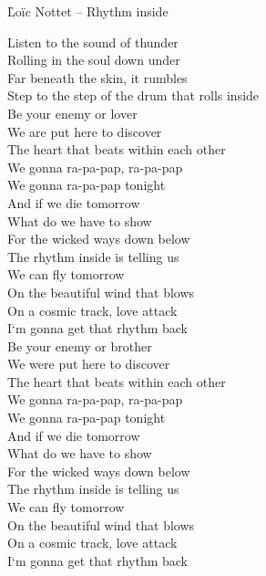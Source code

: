 \documentclass{novel}
\begin{document}
\newpage
\normalsize
\h*{Loïc Nottet – Rhythm inside}
\begin{multicols}{2}
Listen to the sound of thunder \\
Rolling in the soul down under \\
Far beneath the skin, it rumbles \\
Step to the step of the drum that rolls inside \\

Be your enemy or lover \\
We are put here to discover \\
The heart that beats within each other \\

We gonna ra-pa-pap, ra-pa-pap \\
We gonna ra-pa-pap tonight \\

And if we die tomorrow \\
What do we have to show \\
For the wicked ways down below \\
The rhythm inside is telling us \\
We can fly tomorrow \\
On the beautiful wind that blows \\
On a cosmic track, love attack \\

I‘m gonna get that rhythm back \\

Be your enemy or brother \\
We were put here to discover \\
The heart that beats within each other \\

We gonna ra-pa-pap, ra-pa-pap \\
We gonna ra-pa-pap tonight \\

And if we die tomorrow \\
What do we have to show \\
For the wicked ways down below \\
The rhythm inside is telling us \\
We can fly tomorrow \\
On the beautiful wind that blows \\
On a cosmic track, love attack \\

I‘m gonna get that rhythm back \\


\end{multicols}
\end{document}
